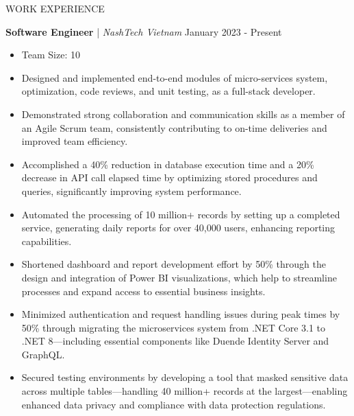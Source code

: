 \begin{rSection}{WORK EXPERIENCE}

      \quad\textbf{Software Engineer} | \textit{NashTech Vietnam} \hfill January 2023 - Present\\
      \begin{itemize}
            \itemsep 0pt {} \vspace{-1em}

            \item Team Size: 10

            \item Designed and implemented end-to-end modules of micro-services system, optimization,
                  code reviews, and unit testing, as a full-stack developer.

            \item Demonstrated strong collaboration and communication skills as a member of an Agile Scrum team,
                  consistently contributing to on-time deliveries and improved team efficiency.

            \item Accomplished a 40\% reduction in database execution time and a 20\% decrease in API call elapsed time
                  by optimizing stored procedures and queries, significantly improving system performance.

            \item Automated the processing of 10 million+ records by setting up a completed service,
                  generating daily reports for over 40,000 users, enhancing reporting capabilities.

            \item Shortened dashboard and report development effort by 50\% through the design and integration of Power BI visualizations,
                  which help to streamline processes and expand access to essential business insights.

            \item Minimized authentication and request handling issues during peak times by 50\% through migrating the microservices
                  system from .NET Core 3.1 to .NET 8—including essential components like Duende Identity Server and GraphQL.

            \item Secured testing environments by developing a tool that masked sensitive data across multiple tables—handling 40 million+ records at the largest—enabling
                  enhanced data privacy and compliance with data protection regulations.


\end{itemize}
\end{rSection}
